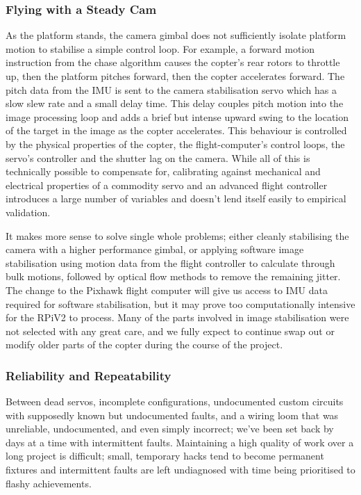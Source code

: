 \documentclass[a4paper, 11pt, titlepage]{article}
\begin{document}
    \subsubsection{Flying with a Steady Cam}
    \label{sec:Camera Stability}
      As the platform stands, the camera gimbal does not sufficiently isolate platform motion to stabilise a simple control loop.
      For example, a forward motion instruction from the chase algorithm causes the copter's rear rotors to throttle up, then the platform pitches forward, then the copter accelerates forward.  The pitch data from the IMU is sent to the camera stabilisation servo which has a slow slew rate and a small delay time.  This delay couples pitch motion into the image processing loop and adds a brief but intense upward swing to the location of the target in the image as the copter accelerates.
      This behaviour is controlled by the physical properties of the copter, the flight-computer's control loops, the servo's controller and the shutter lag on the camera.
      While all of this is technically possible to compensate for, calibrating against mechanical and electrical properties of a commodity servo and an advanced flight controller introduces a large number of variables and doesn't lend itself easily to empirical validation.  

      It makes more sense to solve single whole problems; either cleanly stabilising the camera with a higher performance gimbal, or applying software image stabilisation using motion data from the flight controller to calculate through bulk motions, followed by optical flow methods to remove the remaining jitter.
      The change to the Pixhawk flight computer will give us access to IMU data required for software stabilisation, but it may prove too computationally intensive for the RPiV2 to process.  Many of the parts involved in image stabilisation were not selected with any great care, and we fully expect to continue swap out or modify older parts of the copter during the course of the project.

    \subsubsection{Reliability and Repeatability}
    \label{sec:Reliability}
      Between dead servos, incomplete configurations, undocumented custom circuits with supposedly known but undocumented faults, and a wiring loom that was unreliable, undocumented, and even simply incorrect;  we've been set back by days at a time with intermittent faults.
      Maintaining a high quality of work over a long project is difficult; small, temporary hacks tend to become permanent fixtures and intermittent faults are left undiagnosed with time being prioritised to flashy achievements.
\end{document}
